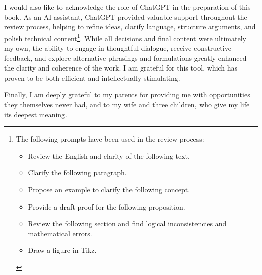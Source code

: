 I would also like to acknowledge the role of ChatGPT in the preparation of this book. As an AI assistant, ChatGPT provided valuable support throughout the review process, helping to refine ideas, clarify language, structure arguments, and polish technical content\footnote{The following prompts have been used in the review process:
\begin{itemize}
\item Review the English and clarity of the following text.
\item Clarify the following paragraph.
\item Propose an example to clarify the following concept.
\item Provide a draft proof for the following proposition.
\item Review the following section and find logical inconsistencies and mathematical errors.
\item Draw a figure in Tikz.
\end{itemize}}. While all decisions and final content were ultimately my own, the ability to engage in thoughtful dialogue, receive constructive feedback, and explore alternative phrasings and formulations greatly enhanced the clarity and coherence of the work. I am grateful for this tool, which has proven to be both efficient and intellectually stimulating.

Finally, I am deeply grateful to my parents for providing me with opportunities they themselves never had, and to my wife and three children, who give my life its deepest meaning.

